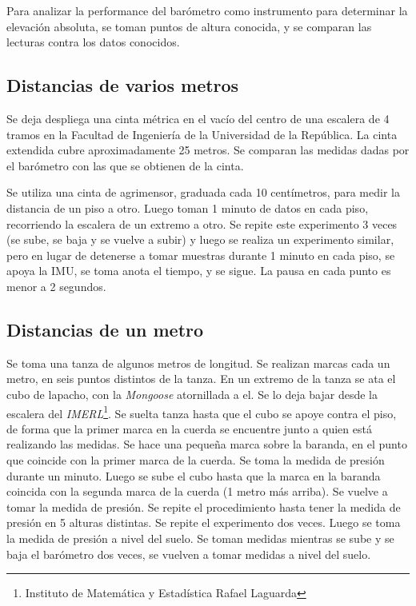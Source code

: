 \documentclass[spanish,12pt,a4paper,titlepage]{report}
\begin{document}
Para analizar la performance del barómetro como instrumento para determinar la elevación absoluta, se toman puntos de altura conocida, y se comparan las lecturas contra los datos conocidos.

\subsection{Distancias de varios metros}

Se deja despliega una cinta métrica en el vacío del centro de una escalera de 4 tramos en la Facultad de Ingeniería de la Universidad de la República. La cinta extendida cubre aproximadamente 25 metros. Se comparan las medidas dadas por el barómetro con las que se obtienen de la cinta.

Se utiliza una cinta de agrimensor, graduada cada 10 centímetros, para medir la distancia de un piso a otro. Luego toman 1 minuto de datos en cada piso, recorriendo la escalera de un extremo a otro. Se repite este experimento 3 veces (se sube, se baja y se vuelve a subir) y luego se realiza un experimento similar, pero en lugar de detenerse a tomar muestras durante 1 minuto en cada piso, se apoya la IMU, se toma anota el tiempo, y se sigue. La pausa en cada punto es menor a 2 segundos.

\subsection{Distancias de un metro}

Se toma una tanza de algunos metros de longitud. Se realizan marcas cada un metro, en seis puntos distintos de la tanza. En un extremo de la tanza se ata el cubo de lapacho, con la \emph{Mongoose} atornillada a el. Se lo deja bajar desde la escalera del \emph{IMERL}\footnote{Instituto de Matemática y Estadística Rafael Laguarda}. Se suelta tanza hasta que el cubo se apoye contra el piso, de forma que la primer marca en la cuerda se encuentre junto a quien está realizando las medidas. Se hace una pequeña marca sobre la baranda, en el punto que coincide con la primer marca de la cuerda. Se toma la medida de presión durante un minuto. Luego se sube el cubo hasta que la marca en la baranda coincida con la segunda marca de la cuerda (1 metro más arriba). Se vuelve a tomar la medida de presión. Se repite el procedimiento hasta tener la medida de presión en 5 alturas distintas. 
Se repite el experimento dos veces. Luego se toma la medida de presión a nivel del suelo. Se toman medidas mientras se sube y se baja el barómetro dos veces, se vuelven a tomar medidas a nivel del suelo.
\end{document}
